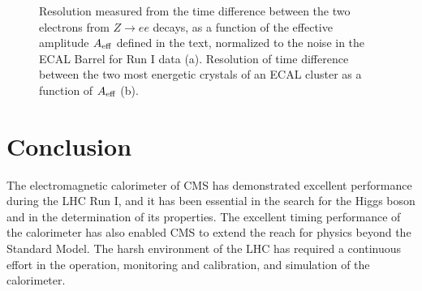 \documentclass[journal]{IEEEtran}
\begin{document}
\begin{figure}[!t]
  \begin{center}
    \caption{Resolution measured from the time difference between the two electrons from $Z\to ee$ decays, as a function of the effective amplitude $A_{\rm eff}$ defined in the text, normalized to the noise in the ECAL Barrel for Run I data (a). Resolution of time difference between the two most energetic crystals of an ECAL cluster as a function of $A_{\rm eff}$ (b). \label{fig:time_resol}}
  \end{center}
\end{figure}
%



\section{Conclusion}
\label{sec:conclusions}
The electromagnetic calorimeter of CMS has demonstrated excellent performance during the LHC Run I, and it has been essential in the search for the Higgs boson and in the determination of its properties. The excellent timing performance of the calorimeter has also enabled CMS to extend the reach for physics beyond the Standard Model. The harsh environment of the LHC has required a continuous effort in the operation, monitoring and calibration, and simulation of the calorimeter. 
\end{document}
